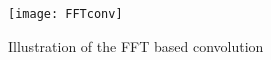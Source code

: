\begin{figure}[H]
\centering
\texttt{[image: FFTconv]}
\caption{Illustration of the FFT based convolution}
\end{figure}

